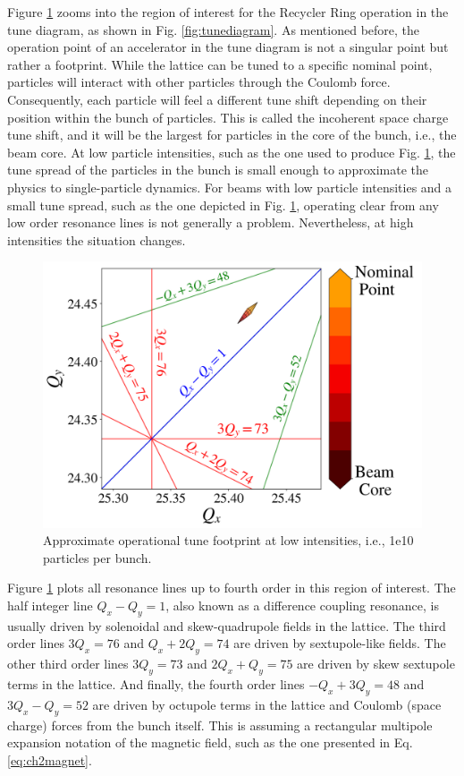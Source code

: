 Figure \ref{fig:rrtdlow} zooms into the region of interest for the Recycler Ring operation in the tune diagram, as shown in Fig. \ref{fig:tunediagram}. As mentioned before, the operation point of an accelerator in the tune diagram is not a singular point but rather a footprint. While the lattice can be tuned to a specific nominal point, particles will interact with other particles through the Coulomb force. Consequently, each particle will feel a different tune shift depending on their position within the bunch of particles. This is called the incoherent space charge tune shift, and it will be the largest for particles in the core of the bunch, i.e., the beam core. At low particle intensities, such as the one used to produce Fig. \ref{fig:rrtdlow}, the tune spread of the particles in the bunch is small enough to approximate the physics to single-particle dynamics. For beams with low particle intensities and a small tune spread, such as the one depicted in Fig. \ref{fig:rrtdlow}, operating clear from any low order resonance lines is not generally a problem. Nevertheless, at high intensities the situation changes.   

 \begin{figure}[H]
    \centering
    \includegraphics[width=\columnwidth]{chapter2/rrtdlow.png}
    \caption{Approximate operational tune footprint at low intensities, i.e., 1e10 particles per bunch.}
    \label{fig:rrtdlow}
 \end{figure}

Figure \ref{fig:rrtdlow} plots all resonance lines up to fourth order in this region of interest. The half integer line $Q_x-Q_y=1$, also known as a difference coupling resonance, is usually driven by solenoidal and skew-quadrupole fields in the lattice. The third order lines $3Q_x=76$ and $Q_x+2Q_y=74$ are driven by sextupole-like fields. The other third order lines $3Q_y=73$ and $2Q_x+Q_y=75$ are driven by skew sextupole terms in the lattice. And finally, the fourth order lines $-Q_x+3Q_y=48$ and $3Q_x-Q_y=52$ are driven by octupole terms in the lattice and Coulomb (space charge) forces from the bunch itself. This is assuming a rectangular multipole expansion notation of the magnetic field, such as the one presented in Eq. \ref{eq:ch2magnet}.      

